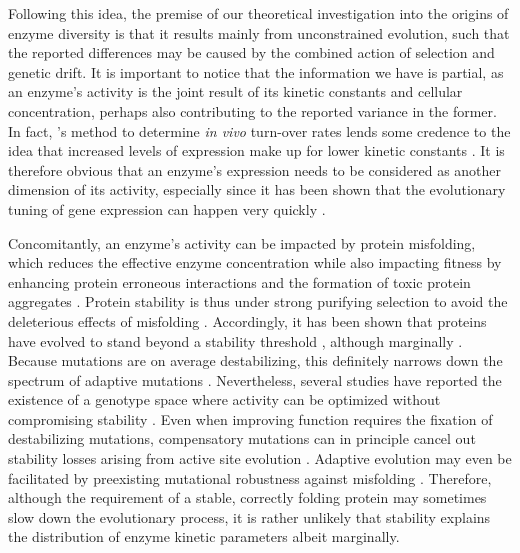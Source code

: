 Following this idea, the premise of our theoretical investigation into the origins of enzyme diversity is that it results mainly from unconstrained evolution, such that the reported differences may be caused by the combined action of selection and genetic drift. It is important to notice that the information we have is partial, as an enzyme's activity is the joint result of its kinetic constants and cellular concentration, perhaps also contributing to the reported variance in the former. In fact, \citet{Davidi16}'s method to determine \textit{in vivo} turn-over rates lends some credence to the idea that increased levels of expression make up for lower kinetic constants \citep{Davidi18}. 
It is therefore obvious that an enzyme's expression needs to be considered as another dimension of its activity, especially since it has been shown that the evolutionary tuning of gene expression can happen very quickly \citep{Dekel05}.

Concomitantly, an enzyme's activity can be impacted by protein misfolding, which reduces the effective enzyme concentration \citep{Tokuriki09,Yue05,Drummond05,Echave17a} while also impacting fitness by enhancing protein erroneous interactions \citep{Yang12} and the formation of toxic protein aggregates \citep{Bucciantini02,Sabate10,Geiler-Samerotte11}. Protein stability is thus under strong purifying selection to avoid the deleterious effects of misfolding \citep{Drummond08}. Accordingly, it has been shown that proteins have evolved to stand beyond a stability threshold \citep{Bloom05}, although marginally \citep{Taverna02}. 
Because mutations are on average destabilizing, this definitely narrows down the spectrum of adaptive mutations \citep{Shoichet95,DePristo05, Weinreich06,Tokuriki07,Tokuriki08, Lunzer10}. Nevertheless, several studies have reported the existence of a genotype space where activity can be optimized without compromising stability \citep{Schreiber94,Burg02,Bloom04,Knies17,Miller17}. Even when improving function requires the fixation of destabilizing mutations, compensatory mutations can in principle cancel out stability losses arising from active site evolution \citep{DePristo05,Tokuriki08,Tokuriki09,Storz18}. Adaptive evolution may even be facilitated by preexisting mutational robustness against misfolding \citep{Bloom06,Bloom07}. Therefore, although the requirement of a stable, correctly folding protein may sometimes slow down the evolutionary process, it is rather unlikely that stability explains the distribution of enzyme kinetic parameters albeit marginally.\\

